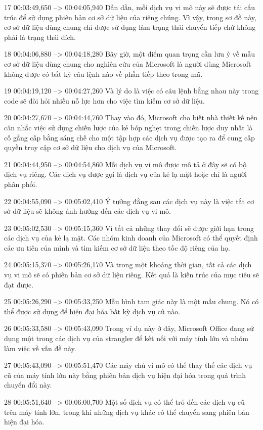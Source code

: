 17
00:03:49,650 --> 00:04:05,940
Dần dần, mỗi dịch vụ vi mô này sẽ được tái cấu trúc để sử dụng phiên bản cơ sở dữ liệu của riêng chúng.  Vì vậy, trong sơ đồ này, cơ sở dữ liệu dùng chung chỉ được sử dụng làm trạng thái chuyển tiếp chứ không phải là trạng thái đích.

18
00:04:06,880 --> 00:04:18,280
Bây giờ, một điểm quan trọng cần lưu ý về mẫu cơ sở dữ liệu dùng chung cho nghiên cứu của Microsoft là người dùng Microsoft không được có bất kỳ câu lệnh nào về phần tiếp theo trong mã.

19
00:04:19,120 --> 00:04:27,260
Và lý do là việc có câu lệnh bằng nhau này trong code sẽ đòi hỏi nhiều nỗ lực hơn cho việc tìm kiếm cơ sở dữ liệu.

20
00:04:27,670 --> 00:04:44,760
Thay vào đó, Microsoft cho biết nhà thiết kế nên cân nhắc việc sử dụng chiến lược của kẻ bóp nghẹt trong chiến lược duy nhất là cố gắng cấp bằng sáng chế cho một tập hợp các dịch vụ được tạo ra để cung cấp quyền truy cập cơ sở dữ liệu cho dịch vụ của Microsoft.

21
00:04:44,950 --> 00:04:54,860
Mỗi dịch vụ vi mô được mô tả ở đây sẽ có bộ dịch vụ riêng.  Các dịch vụ được gọi là dịch vụ của kẻ lạ mặt hoặc chỉ là người phân phối.

22
00:04:55,090 --> 00:05:02,410
Ý tưởng đằng sau các dịch vụ này là việc tắt cơ sở dữ liệu sẽ không ảnh hưởng đến các dịch vụ vi mô.

23
00:05:02,530 --> 00:05:15,360
Vì tất cả những thay đổi sẽ được giới hạn trong các dịch vụ của kẻ lạ mặt.  Các nhóm kinh doanh của Microsoft có thể quyết định các ưu tiên của mình và tìm kiếm cơ sở dữ liệu theo tốc độ riêng của họ.

24
00:05:15,370 --> 00:05:26,170
Và trong một khoảng thời gian, tất cả các dịch vụ vi mô sẽ có phiên bản cơ sở dữ liệu riêng.  Kết quả là kiến ​​trúc của mục tiêu sẽ đạt được.

25
00:05:26,290 --> 00:05:33,250
Mẫu hình tam giác này là một mẫu chung.  Nó có thể được sử dụng để hiện đại hóa bất kỳ dịch vụ cũ nào.

26
00:05:33,580 --> 00:05:43,090
Trong ví dụ này ở đây, Microsoft Office đang sử dụng một trong các dịch vụ của strangler để kết nối với máy tính lớn và nhóm làm việc về vấn đề này.

27
00:05:43,090 --> 00:05:51,470
Các máy chủ vi mô có thể thay thế các dịch vụ cũ của máy tính lớn này bằng phiên bản dịch vụ hiện đại hóa trong quá trình chuyển đổi này.

28
00:05:51,640 --> 00:06:00,700
Một số dịch vụ có thể trỏ đến các dịch vụ cũ trên máy tính lớn, trong khi những dịch vụ khác có thể chuyển sang phiên bản hiện đại hóa.

